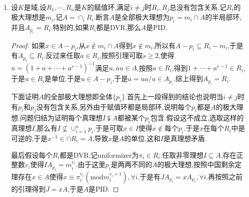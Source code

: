 \begin{enumerate}
\begin{proof}
    	只需验证$I\subseteq J$,对称性得到$I=J$.任取$x\in I$,任取极大理想$m$,从$x\in IA_m=JA_m$得到存在$y_m\in J$和$s_m\in A-m$使得在$A_m$中有$x/1=y_m/s_m$.于是存在$t_m\in A-m$满足$t_ms_mx=y_mt_m\in A$.我们断言当$m$取遍$A$的极大理想时$t_ms_m$生成了单位理想.否则它生成的真理想要包含在某个极大理想$m_0$中,但是这导致$t_{m_0}s_{m_0}\in m_0$矛盾.于是存在$A$的有限个极大理想$\{m_1,\cdots,m_n\}$和$c_i\in A$使得$1=\sum_{i=1}^nc_it_{m_i}s_{m_i}$.于是有$x=\sum_{i=1}^nc_it_{m_i}s_{m_i}x=\sum_{i=1}^nc_iy_{m_i}t_{m_i}\in J$.这得到$x\in J$,于是有$I\subseteq J$.
    \end{proof}
    \item 设$K$是域,设$R_1,\cdots,R_n$是$K$的赋值环,满足$i\not=j$时$R_i,R_j$总没有包含关系.记$R_i$的极大理想是$m_i$,记$A=\cap_iR_i$.断言$A$是全部极大理想为$p_i=m_i\cap A$的半局部环,并且$A_{p_i}=R_i$.特别的,如果$R_i$都是DVR,那么$A$是PID.
    \begin{proof}
    	
    	如果$x\in A-p_i$,从$x\not\in m_i\cap A$得到$x\not\in m_i$,所以有$A-p_i\subseteq R_i-m_i$,于是有$A_{p_i}\subseteq R_i$.反过来任取$a\in R_i$,按照引理可取$s\ge2$,使得$u=(1+a+\cdots+a^{s-1})^{-1}$满足$u,au\in A$.按照$a\in R_i$,得到$1+\cdots+a^{s-1}\in R_i$,于是$u\in R_i$是单位.于是$u\in A-p_i$,于是$a=ua/u\in A_{p_i}$.综上得到$A_{p_i}=R_i$.
    	
    	\qquad
    	
    	下面证明$A$的全部极大理想即全体$\{p_i\}$.首先上一段得到的结论也说明当$i\not=j$时有$p_i$和$p_j$没有包含关系,另外由于赋值环都是局部环,说明每个$p_i$都是$A$的极大理想.问题归结为证明每个真理想$I\subsetneqq A$都被某个$p_i$包含.假设这不成立,选取这样的真理想$I$,那么有$I\not\subseteq\cup_{i=1}^np_i$.于是可取$x\in I$使得$x\not\in$每个$p_i$.于是$x$在每个$R_i$中是可逆的,于是$x^{-1}\in\cap R_i=A$,导致$x$是$A$的单位,这和$I$是真理想矛盾.
    	
    	\qquad
    	
    	最后假设每个$R_i$都是DVR,记uniformizer为$\pi_i\in R_i$.任取非零理想$I\subseteq A$,存在正整数$v_i$使得$IA_{p_i}=m_i^{v_i}$.由于这里$p_i$是两两不同的$A$的极大理想,按照中国剩余定理存在$x\in A$使得$x\equiv\pi_i^{v_i}(\mathrm{mod}m_i^{v_i+1}),\forall i$.于是有$JA_{p_i}=xA_{p_i},\forall i$.再按照之前的引理得到$J=xA$,于是$A$是PID.
    \end{proof}
\end{enumerate}

